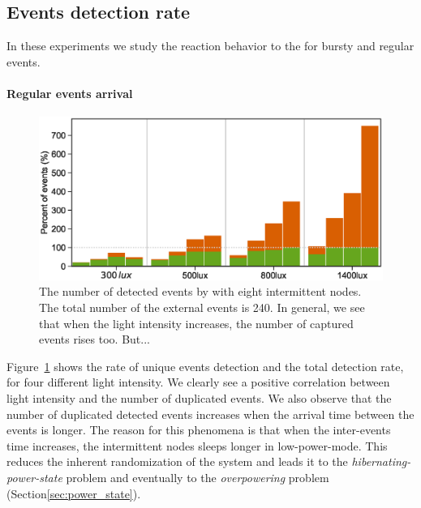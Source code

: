\subsection{Events detection rate}
In these experiments we study the reaction behavior to the \sys for bursty and regular events.
\paragraph{Regular events arrival}
\begin{figure}[t]
		\centering
		\includegraphics[width=\columnwidth]{figures/regular_events_capture_rate.eps}
		\caption{The number of detected events by \fullcim with eight intermittent nodes. The total number of the external events is 240. In general, we see that when the light intensity increases, the number of captured events rises too. But... }
		\label{fig:events_detection_rate}
\end{figure}

Figure~\ref{fig:events_detection_rate} shows the rate of unique events detection and the total detection rate, for four different light intensity. We clearly see a positive correlation between light intensity and the number of duplicated events. We also observe that the number of duplicated detected events increases when the arrival time between the events is longer. The reason for this phenomena is that when the inter-events time increases, the intermittent nodes sleeps longer in low-power-mode. This reduces the inherent randomization of the system and leads it to the \textit{hibernating-power-state} problem and eventually to the \textit{overpowering} problem (Section\ref{sec:power_state}).  
 


